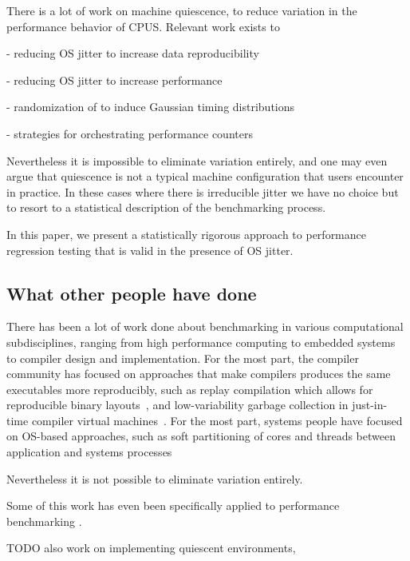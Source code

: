 \documentclass[conference]{IEEEtran}
\begin{document}
There is a lot of work on machine quiescence, to reduce variation in the performance
behavior of CPUS. Relevant work exists to

- reducing OS jitter to increase data reproducibility

- reducing OS jitter to increase performance

- randomization of  to induce Gaussian timing distributions

- strategies for orchestrating performance counters

Nevertheless it is impossible to eliminate variation
entirely, and one may even argue that quiescence is not a typical machine
configuration that users encounter in practice.
In these cases where there is irreducible jitter we have no choice but to resort to a statistical description of the benchmarking process.

In this paper, we present a statistically rigorous approach to performance regression
testing that is valid in the presence of OS jitter.



\subsection{What other people have done}

There has been a lot of work done about benchmarking in various computational subdisciplines, ranging from high performance computing to embedded systems to compiler design and implementation. For the most part, the compiler community has focused on approaches that make compilers produces the same executables more reproducibly, such as replay compilation which allows for reproducible binary layouts~\cite{Georges2015}, and low-variability garbage collection in just-in-time compiler virtual machines~\cite{Huang2004}. For the most part, systems people have focused on OS-based approaches, such as soft partitioning of cores and threads between application and systems processes~\cite{Akkan2012}

Nevertheless it is not possible to eliminate variation entirely.

Some of this work has even been specifically applied to performance benchmarking \cite{Alcocer2015,Barrett2016}.

TODO also work on implementing quiescent environments,
\end{document}
